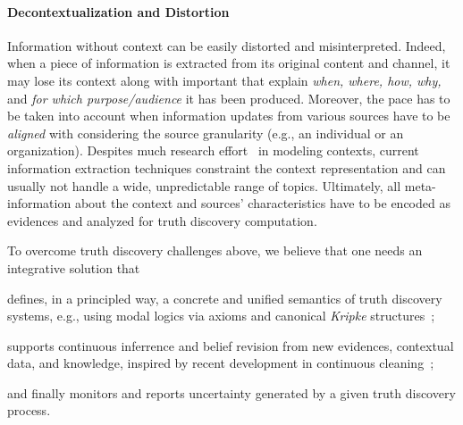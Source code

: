 \documentclass[prodmode,acmtecs]{acmsmall} %
\begin{document}
\paragraph*{Decontextualization and Distortion}  
Information without context can be easily distorted and misinterpreted.
Indeed, when a piece of information is extracted from its original 
content and channel, it may lose its context along with important 
 that explain \emph{when, where, how, why,} and
\emph{for which purpose/audience} it has been produced.
Moreover, the pace has to be taken into account when information updates from 
various sources have to be \emph{aligned} with considering the source granularity 
(e.g., an individual or an organization). 
Despites much research effort~\cite{eps270829} in modeling contexts, current information
extraction techniques constraint the 
context representation and can usually not handle a wide, unpredictable range of topics. Ultimately,
all meta-information about the context and sources' 
characteristics have to be encoded as evidences and analyzed for truth discovery computation.

\iffalse
Besides challenges given above, \emph{cross-modal} and \emph{dynamic} truth discovery
are also in their infancy. Cross-modality is needed because of the multiple possible facets,
e.g., textual, pictures, and movies, of the same information that need to be reconcilied.
Dynamicity is due by the fact recieved information could be subjet to multiple transformations
through the transmission media or intermediate applications during its life cycle. We believe that directions
for tacking these appealing truth discovery problems could be 
\fi

To overcome truth discovery challenges above, we believe that one needs an integrative solution that
\begin{inparaenum}[(i)]
\item defines, in a principled way, a concrete and unified semantics of truth discovery systems, e.g., using
modal logics via axioms and canonical 
\emph{Kripke} structures~\cite{GorankoOtto06};
\item supports continuous inferrence and belief revision from new evidences, contextual data, and knowledge, inspired by recent development
in continuous cleaning~\cite{VCSM14};
\item and finally monitors and reports uncertainty generated by a given truth discovery process.
\end{inparaenum}









\medskip
\end{document}
